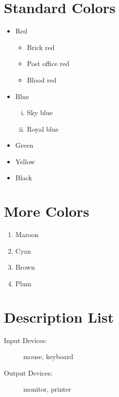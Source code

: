 \documentclass{article}
\begin{document}
	\section{Standard Colors}
	\begin{itemize}
		\item Red
		\begin{itemize} %
			\item Brick red
			\item Post office red
			\item Blood red
		\end{itemize}
		\item Blue
		\begin{enumerate}[i.]
			\item Sky blue
			\item Royal blue
		\end{enumerate}
		\item Green
		\item Yellow
		\item Black
	\end{itemize}
	
	\section{More Colors}
	\begin{enumerate}
		\item Maroon
		\item Cyan
		\item Brown
		\item Plum
	\end{enumerate}
	
	\section{Description List}
	\begin{description}
		\item[Input Devices:] mouse, keyboard
		\item[Output Devices:] monitor, printer
	\end{description}
\end{document}
